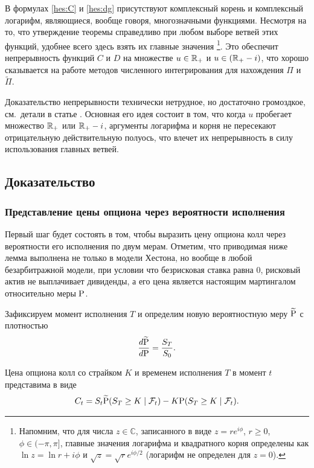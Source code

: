\begin{remark}
В формулах \eqref{hes:C} и \eqref{hes:dg} присутствуют комплексный корень и комплексный логарифм, являющиеся, вообще говоря, многозначными функциями.
Несмотря на то, что утверждение теоремы справедливо при любом выборе ветвей этих функций, удобнее всего здесь взять их главные значения%
\footnote{Напомним, что для числа $z\in\mathbb{C}$, записанного в виде $z=re^{i\phi}$, $r\ge 0$, $\phi\in(-\pi,\pi]$, главные значения логарифма и квадратного корня определены как $\ln z = \ln r + i\phi$ и $\sqrt{z} = \sqrt{r}e^{i\phi/2}$ (логарифм не определен для $z=0$).}. Это обеспечит непрерывность функций $C$ и $D$ на множестве $u\in\R_+$ и $u\in (\R_+-i)$, что хорошо сказывается на работе методов численного интегрирования для нахождения $\Pi$ и $\tilde\Pi$.

Доказательство непрерывности технически нетрудное, но достаточно громоздкое, см.~детали в статье \cite{Albrecher+07}.
Основная его идея состоит в том, что когда $u$ пробегает множество $\R_+$ или $\R_+-i$, аргументы логарифма и корня не пересекают отрицательную действительную полуось, что влечет их непрерывность в силу использования главных ветвей.
\end{remark}


\subsection{Доказательство}
\subsubsection{Представление цены опциона через вероятности исполнения}

Первый шаг будет состоять в том, чтобы выразить цену опциона колл через вероятности его исполнения по двум мерам.
Отметим, что приводимая ниже лемма выполнена не только в модели Хестона, но вообще в любой безарбитражной модели, при условии что безрисковая ставка равна 0, рисковый актив не выплачивает дивиденды, а его цена является настоящим мартингалом относительно меры $\P$.

Зафиксируем момент исполнения $T$ и определим новую вероятностную меру $\tilde\P$ с плотностью
\[
\frac{d\tilde\P}{d\P} = \frac{S_T}{S_0}. 
\]

\begin{lemma}
\label{hes:l:price-through-prob}
Цена опциона колл со страйком $K$ и временем исполнения $T$ в момент $t$ представима в виде 
\[
C_t = S_t \tilde\P(S_T\ge K\mid \F_t) - K\P(S_T\ge K\mid \F_t).
\]
\end{lemma}

